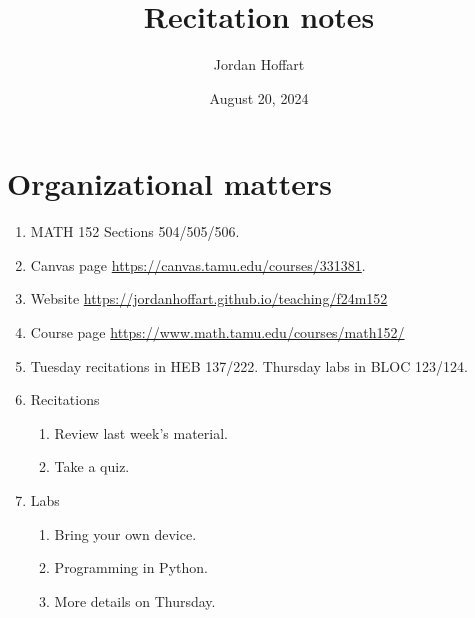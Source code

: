 \documentclass{article}
\title{Recitation notes}
\author{Jordan Hoffart}
\date{August 20, 2024}
\theoremstyle{plain}
\begin{document}
\theoremstyle{definition}
\newtheorem{definition}{Definition}
\newtheorem{example}{Example}
\maketitle
\section{Organizational matters}
\begin{enumerate}
	\item MATH 152 Sections 504/505/506.
	\item Canvas page \url{https://canvas.tamu.edu/courses/331381}.
	\item Website \url{https://jordanhoffart.github.io/teaching/f24m152}
	\item Course page \url{https://www.math.tamu.edu/courses/math152/}
	\item Tuesday recitations in HEB 137/222.
	      Thursday labs in BLOC 123/124.
	\item Recitations
	      \begin{enumerate}
		      \item Review last week's material.
		      \item Take a quiz.
	      \end{enumerate}
	\item Labs
	      \begin{enumerate}
		      \item Bring your own device.
		      \item Programming in Python.
		      \item More details on Thursday.
	      \end{enumerate}
\end{enumerate}
\end{document}
